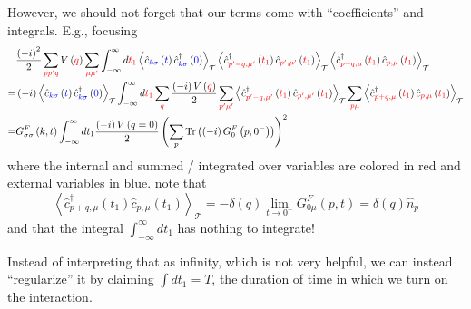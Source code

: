 However, we should not forget that our terms come with ``coefficients'' and integrals. E.g., focusing
\begin{align*}
    &\frac{\left( -i \right) ^2}{2}\sum_{{\color{red} pp'q}}{V\left( {\color{red} q} \right) \sum_{{\color{red} \mu \mu '}}{\int_{-\infty}^{\infty}{d{\color{red} t_1}\left< \hat{c}_{{\color[RGB]{0, 0, 240} k\sigma }}\left( {\color[RGB]{0, 0, 240} t} \right) \hat{c}_{{\color[RGB]{0, 0, 240} k\sigma }}^{\dagger}\left( {\color[RGB]{0, 0, 240} 0} \right) \right> _{\mathcal{T}}\left< \hat{c}_{{\color{red} p'-q,\mu '}}^{\dagger}\left( {\color{red} t_1} \right) \hat{c}_{{\color{red} p',\mu '}}\left( {\color{red} t_1} \right) \right> _{\mathcal{T}}\left< \hat{c}_{{\color{red} p+q,\mu }}^{\dagger}\left( {\color{red} t_1} \right) \hat{c}_{{\color{red} p,\mu }}\left( {\color{red} t_1} \right) \right> _{\mathcal{T}}}}}\\
    =&\left( -i \right) \left< \hat{c}_{{\color[RGB]{0, 0, 240} k\sigma }}\left( {\color[RGB]{0, 0, 240} t} \right) \hat{c}_{{\color[RGB]{0, 0, 240} k\sigma }}^{\dagger}\left( {\color[RGB]{0, 0, 240} 0} \right) \right> _{\mathcal{T}}\int_{-\infty}^{\infty}{d{\color{red} t_1}\sum_{{\color{red} q}}{\frac{\left( -i \right) V\left( {\color{red} q} \right)}{2}\sum_{{\color{red} p'\mu '}}{\left< \hat{c}_{{\color{red} p'-q,\mu '}}^{\dagger}\left( {\color{red} t_1} \right) \hat{c}_{{\color{red} p',\mu '}}\left( {\color{red} t_1} \right) \right> _{\mathcal{T}}\sum_{{\color{red} p\mu }}{\left< \hat{c}_{{\color{red} p+q,\mu }}^{\dagger}\left( {\color{red} t_1} \right) \hat{c}_{{\color{red} p,\mu }}\left( {\color{red} t_1} \right) \right> _{\mathcal{T}}}}}}\\
    =&G_{\sigma \sigma}^{F}\left( k,t \right) \int_{-\infty}^{\infty}{dt_1\frac{\left( -i \right) V\left( q=0 \right)}{2}\left( \sum_p{\mathrm{Tr}\left( \left( -i \right) G_{0}^{F}\left( p,0^- \right) \right)} \right) ^2}
\end{align*}
where the internal and summed / integrated over variables are colored in red and external variables in blue.
note that
\[ \left< \hat{c}_{p+q,\mu}^{\dagger}\left( t_1 \right) \hat{c}_{p,\mu}\left( t_1 \right) \right> _{\mathcal{T}}=-\delta \left( q \right) \lim_{t\rightarrow 0^-} G_{0\mu}^{F}\left( p,t \right) =\delta \left( q \right) \hat{n}_p\]
and that the integral $\int_{-\infty}^{\infty}dt_1$ has nothing to integrate!

Instead of interpreting that as infinity, which is not very helpful, we can instead ``regularize'' it by claiming $\int{dt_1}=T$, the duration of time in which we turn on the interaction.


